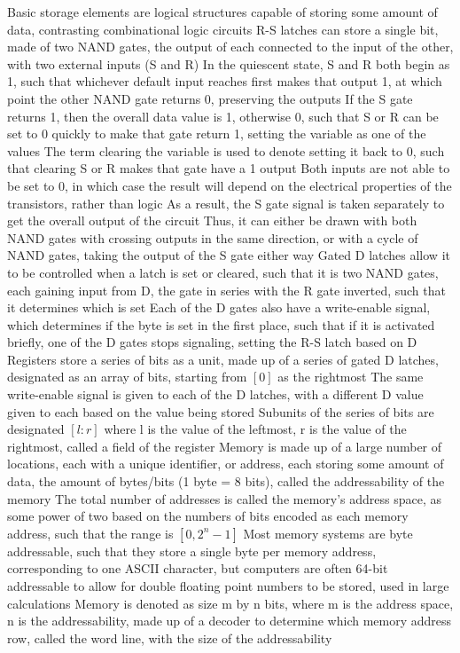 \documentclass[11 pt, twoside]{article}
\newenvironment{outline*}
{
	\begin{outline}[enumerate]
	}
	{\end{outline}
}
\begin{document}
\begin{outline*}
\1 Basic storage elements are logical structures capable of storing some amount of data, contrasting combinational logic circuits
\2 R-S latches can store a single bit, made of two NAND gates, the output of each connected to the input of the other, with two external inputs (S and R)
\3 In the quiescent state, S and R both begin as 1, such that whichever default input reaches first makes that output 1, at which point the other NAND gate returns 0, preserving the outputs
\3 If the S gate returns 1, then the overall data value is 1, otherwise 0, such that S or R can be set to 0 quickly to make that gate return 1, setting the variable as one of the values
\3 The term clearing the variable is used to denote setting it back to 0, such that clearing S or R makes that gate have a 1 output
\3 Both inputs are not able to be set to 0, in which case the result will depend on the electrical properties of the transistors, rather than logic
\3 As a result, the S gate signal is taken separately to get the overall output of the circuit
\3 Thus, it can either be drawn with both NAND gates with crossing outputs in the same direction, or with a cycle of NAND gates, taking the output of the S gate either way
\2 Gated D latches allow it to be controlled when a latch is set or cleared, such that it is two NAND gates, each gaining input from D, the gate in series with the R gate inverted, such that it determines which is set
\3 Each of the D gates also have a write-enable signal, which determines if the byte is set in the first place, such that if it is activated briefly, one of the D gates stops signaling, setting the R-S latch based on D
\2 Registers store a series of bits as a unit, made up of a series of gated D latches, designated as an array of bits, starting from $[0]$ as the rightmost
\3 The same write-enable signal is given to each of the D latches, with a different D value given to each based on the value being stored
\3 Subunits of the series of bits are designated $[l:r]$ where l is the value of the leftmost, r is the value of the rightmost, called a field of the register
\1 Memory is made up of a large number of locations, each with a unique identifier, or address, each storing some amount of data, the amount of bytes/bits (1 byte = 8 bits), called the addressability of the memory
\2 The total number of addresses is called the memory's address space, as some power of two based on the numbers of bits encoded as each memory address, such that the range is $[0, 2^{n} - 1]$
\2 Most memory systems are byte addressable, such that they store a single byte per memory address, corresponding to one ASCII character, but computers are often 64-bit addressable to allow for double floating point numbers to be stored, used in large calculations\1 Memory is denoted as size m by n bits, where m is the address space, n is the addressability, made up of a decoder to determine which memory address row, called the word line, with the size of the addressability

\end{outline*}
\end{document}
